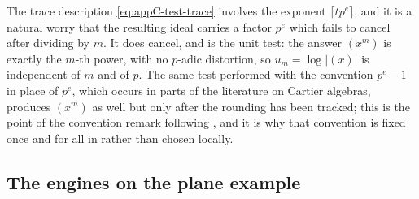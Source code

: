 \begin{remark}
\label{rem:ch40-no-frobenius-factor}
The trace description \eqref{eq:appC-test-trace} involves the exponent
$\lceil tp^e\rceil$, and it is a natural worry that the resulting ideal
carries a factor $p^e$ which fails to cancel after dividing by $m$.  It
does cancel, and  is the unit test: the
answer $(x^m)$ is exactly the $m$-th power, with no $p$-adic
distortion, so $u_m=\log|(x)|$ is independent of $m$ and of $p$.  The
same test performed with the convention $p^e-1$ in place of $p^e$, which
occurs in parts of the literature on Cartier algebras, produces
$(x^{m})$ as well but only after the rounding has been tracked; this is
the point of the convention remark following
, and it is why that convention is fixed once and
for all in  rather than chosen locally.
\end{remark}

\subsection{The engines on the plane example}
\label{sec:ch40-p2-engines}

